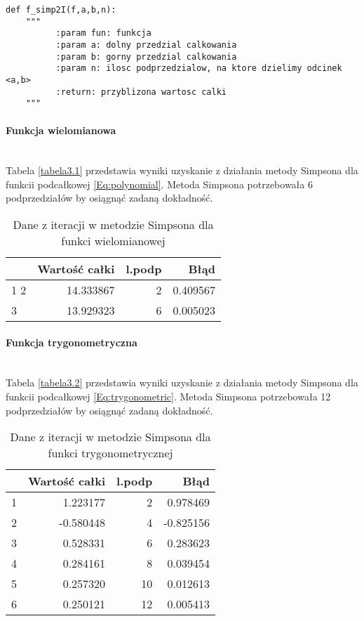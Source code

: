 \documentclass[12pt,twoside]{article}
\begin{document}
\begin{lstlisting}[caption={Kod w języku python implementujący metodę prostokątów}]
def f_simp2I(f,a,b,n):
    """
     	  :param fun: funkcja
          :param a: dolny przedzial calkowania
          :param b: gorny przedzial calkowania
          :param n: ilosc podprzedzialow, na ktore dzielimy odcinek <a,b>
          :return: przyblizona wartosc calki
    """
\end{lstlisting}
\label{Listing 8}

\paragraph{Funkcja wielomianowa}\mbox{} \\

Tabela \eqref{tabela3.1} przedstawia wyniki uzyskanie z działania metody Simpsona dla funkcii podcałkowej \eqref{Eq:polynomial}. Metoda Simpsona potrzebowała 6 podprzedziałów by osiągnąć zadaną dokładność.

\begin{table}[H]
\centering 
\caption{Dane z iteracji w metodzie Simpsona dla funkci wielomianowej}
\label{tabela3.1}
\begin{tabular}{lrrr}
\toprule
{} &  Wartość całki &  l.podp &      Błąd \\
\midrule
1
2 &      14.333867 &       2 &  0.409567 \\
3 &      13.929323 &       6 &  0.005023 \\
\bottomrule
\end{tabular}
\end{table}

\paragraph{Funkcja trygonometryczna}\mbox{} \\

Tabela \eqref{tabela3.2} przedstawia wyniki uzyskanie z działania metody Simpsona dla funkcii podcałkowej \eqref{Eq:trygonometric}. Metoda Simpsona potrzebowała 12 podprzedziałów by osiągnąć zadaną dokładność.

\begin{table}[H]
\centering
\caption{Dane z iteracji w metodzie Simpsona dla funkci trygonometrycznej}
\label{tabela3.2}
\begin{tabular}{lrrr}
\toprule
{} &  Wartość całki &  l.podp &      Błąd \\
\midrule
1 &       1.223177 &       2 &  0.978469 \\
2 &      -0.580448 &       4 & -0.825156 \\
3 &       0.528331 &       6 &  0.283623 \\
4 &       0.284161 &       8 &  0.039454 \\
5 &       0.257320 &      10 &  0.012613 \\
6 &       0.250121 &      12 &  0.005413 \\
\bottomrule
\end{tabular}
\end{table}
\end{document}
